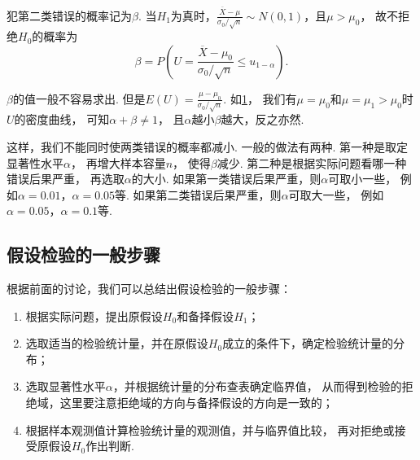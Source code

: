 犯第二类错误的概率记为\(\beta\).
当\(H_1\)为真时，\(\frac{\overline{X}-\mu}{\sigma_0/\sqrt{n}} \sim N(0,1)\)，且\(\mu>\mu_0\)，
故不拒绝\(H_0\)的概率为\begin{equation*}
	\beta=P\left(U=\frac{\overline{X}-\mu_0}{\sigma_0/\sqrt{n}} \leq u_{1-\alpha}\right).
\end{equation*}

\(\beta\)的值一般不容易求出.
但是\(E(U)=\frac{\mu-\mu_0}{\sigma_0/\sqrt{n}}\).
如\cref{figure:假设检验.两类错误}，
我们有\(\mu=\mu_0\)和\(\mu=\mu_1>\mu_0\)时\(U\)的密度曲线，
可知\(\alpha+\beta\neq1\)，
且\(\alpha\)越小\(\beta\)越大，反之亦然.

\begin{figure}[htb]
	\centering
	\caption{}
	\label{figure:假设检验.两类错误}
\end{figure}

这样，我们不能同时使两类错误的概率都减小.
一般的做法有两种.
第一种是取定显著性水平\(\alpha\)，
再增大样本容量\(n\)，
使得\(\beta\)减少.
第二种是根据实际问题看哪一种错误后果严重，
再选取\(\alpha\)的大小.
如果第一类错误后果严重，则\(\alpha\)可取小一些，
例如\(\alpha=0.01\)，\(\alpha=0.05\)等.
如果第二类错误后果严重，则\(\alpha\)可取大一些，
例如\(\alpha=0.05\)，\(\alpha=0.1\)等.

\subsection{假设检验的一般步骤}
根据前面的讨论，我们可以总结出假设检验的一般步骤：\begin{enumerate}
	\item 根据实际问题，提出原假设\(H_0\)和备择假设\(H_1\)；
	\item 选取适当的检验统计量，并在原假设\(H_0\)成立的条件下，确定检验统计量的分布；
	\item 选取显著性水平\(\alpha\)，并根据统计量的分布查表确定临界值，
	从而得到检验的拒绝域，这里要注意拒绝域的方向与备择假设的方向是一致的；
	\item 根据样本观测值计算检验统计量的观测值，并与临界值比较，
	再对拒绝或接受原假设\(H_0\)作出判断.
\end{enumerate}

